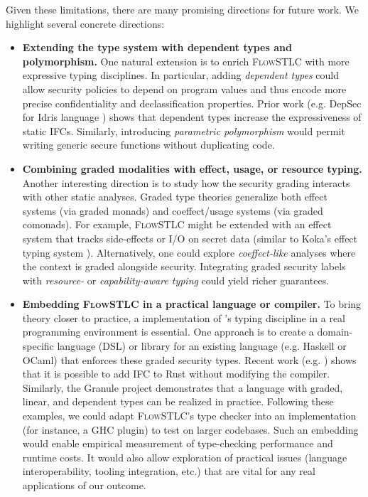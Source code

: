 \documentclass[conference]{IEEEtran}
\begin{document}
Given these limitations, there are many promising directions for future work. We highlight several concrete directions:
\begin{itemize}
    \item \textbf{Extending the type system with dependent types and polymorphism.} One natural extension is to enrich \textsc{FlowSTLC} with more expressive typing disciplines. In particular, adding \emph{dependent types} could allow security policies to depend on program values and thus encode more precise confidentiality and declassification properties. Prior work (e.g. DepSec for Idris language \cite{gregersen2019dependently}) shows that dependent types increase the expressiveness of static IFCs. Similarly, introducing \emph{parametric polymorphism} would permit writing generic secure functions without duplicating code.
    \item \textbf{Combining graded modalities with effect, usage, or resource typing.} Another interesting direction is to study how the security grading interacts with other static analyses. Graded type theories generalize both effect systems (via graded monads) and coeffect/usage systems (via graded comonads). For example, \textsc{FlowSTLC} might be extended with an effect system that tracks side-effects or I/O on secret data (similar to Koka's effect typing system \cite{leijen2014koka} \cite{leijen2016algebraic}). Alternatively, one could explore \emph{coeffect-like} analyses where the context is graded alongside security. Integrating graded security labels with \emph{resource-} or \emph{capability-aware typing} could yield richer guarantees.
    \item \textbf{Embedding \textsc{FlowSTLC} in a practical language or compiler.} To bring theory closer to practice, a implementation of 's typing discipline in a real programming environment is essential. One approach is to create a domain-specific language (DSL) or library for an existing language (e.g. Haskell or OCaml) that enforces these graded security types. Recent work (e.g. \cite{lamba2024cocoon}) shows that it is possible to add IFC to Rust without modifying the compiler. Similarly, the Granule project \cite{orchard2019quantitative} demonstrates that a language with graded, linear, and dependent types can be realized in practice. Following these examples, we could adapt \textsc{FlowSTLC}'s type checker into an implementation (for instance, a GHC plugin) to test on larger codebases. Such an embedding would enable empirical measurement of type-checking performance and runtime costs. It would also allow exploration of practical issues (language interoperability, tooling integration, etc.) that are vital for any real applications of our outcome.
\end{itemize}
\end{document}
